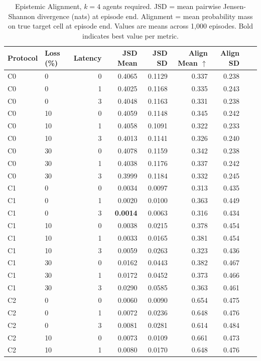 \documentclass[pdflatex,sn-mathphys-num]{sn-jnl}%
\theoremstyle{thmstyleone}%
\theoremstyle{thmstyletwo}%
\theoremstyle{thmstylethree}%
\begin{document}
\begin{appendices}
\begin{table}
\centering
\caption{Epistemic Alignment, $k=4$ agents required. JSD = mean pairwise Jensen-Shannon divergence (nats) at episode end. Alignment = mean probability mass on true target cell at episode end. Values are means across 1,000 episodes. Bold indicates best value per metric.}
\label{tab:appendix_epistemic_c}
\small
\begin{tabular}{llrrrrrrr}
\toprule
Protocol & Loss (\%) & Latency & JSD Mean & JSD SD & Align Mean $\uparrow$ & Align SD \\
\midrule
C0 & 0 & 0 & 0.4065 & 0.1129 & 0.337 & 0.238 \\
C0 & 0 & 1 & 0.4025 & 0.1168 & 0.335 & 0.243 \\
C0 & 0 & 3 & 0.4048 & 0.1163 & 0.331 & 0.238 \\
C0 & 10 & 0 & 0.4059 & 0.1148 & 0.345 & 0.242 \\
C0 & 10 & 1 & 0.4058 & 0.1091 & 0.322 & 0.233 \\
C0 & 10 & 3 & 0.4013 & 0.1141 & 0.326 & 0.240 \\
C0 & 30 & 0 & 0.4078 & 0.1159 & 0.342 & 0.238 \\
C0 & 30 & 1 & 0.4038 & 0.1176 & 0.337 & 0.242 \\
C0 & 30 & 3 & 0.3999 & 0.1184 & 0.332 & 0.245 \\
\addlinespace[4pt]
C1 & 0 & 0 & 0.0034 & 0.0097 & 0.313 & 0.435 \\
C1 & 0 & 1 & 0.0020 & 0.0100 & 0.363 & 0.449 \\
C1 & 0 & 3 & \textbf{0.0014} & 0.0063 & 0.316 & 0.434 \\
C1 & 10 & 0 & 0.0038 & 0.0215 & 0.378 & 0.454 \\
C1 & 10 & 1 & 0.0033 & 0.0165 & 0.381 & 0.454 \\
C1 & 10 & 3 & 0.0059 & 0.0263 & 0.323 & 0.436 \\
C1 & 30 & 0 & 0.0162 & 0.0443 & 0.382 & 0.467 \\
C1 & 30 & 1 & 0.0172 & 0.0452 & 0.373 & 0.466 \\
C1 & 30 & 3 & 0.0290 & 0.0585 & 0.363 & 0.461 \\
\addlinespace[4pt]
C2 & 0 & 0 & 0.0060 & 0.0090 & 0.654 & 0.475 \\
C2 & 0 & 1 & 0.0072 & 0.0236 & 0.648 & 0.476 \\
C2 & 0 & 3 & 0.0081 & 0.0281 & 0.614 & 0.484 \\
C2 & 10 & 0 & 0.0073 & 0.0109 & 0.661 & 0.473 \\
C2 & 10 & 1 & 0.0080 & 0.0170 & 0.648 & 0.476 \\

\end{tabular}
\end{table}
\end{appendices}
\end{document}
